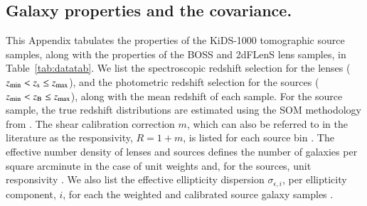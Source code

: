 \begin{appendix} 
\section{Galaxy properties and the \tttp covariance.}
\label{app:properties}

This Appendix tabulates the properties of the KiDS-1000 tomographic source samples, along with the properties of the BOSS and 2dFLenS lens samples, in Table~\ref{tab:datatab}.   
We list the spectroscopic redshift selection for the lenses ($z_{\rm min} < z_{\rm s} \leq z_{\rm max}$), and the photometric redshift selection for the sources ($z_{\rm min} < z_{\rm B} \leq z_{\rm max}$), along with the mean redshift of each sample.  
For the source sample, the true redshift distributions are estimated using the SOM methodology from \citet{wright/etal:2020}.     
The shear calibration correction $m$, which can also be referred to in the literature as the responsivity, $R = 1+m$, is listed for each source bin \citep{kannawadi/etal:2019}.  
The effective number density of lenses and sources defines the number of galaxies per square arcminute in the case of unit weights and, for the sources, unit responsivity \citep[see equations C.11 and C.13 in][]{joachimi/etal:inprep}.  
We also list the effective ellipticity dispersion $\sigma_{\epsilon,i}$, per ellipticity component, $i$, for each the weighted and calibrated source galaxy samples \citep[equation C.8 in][]{joachimi/etal:inprep}.


\end{appendix}
